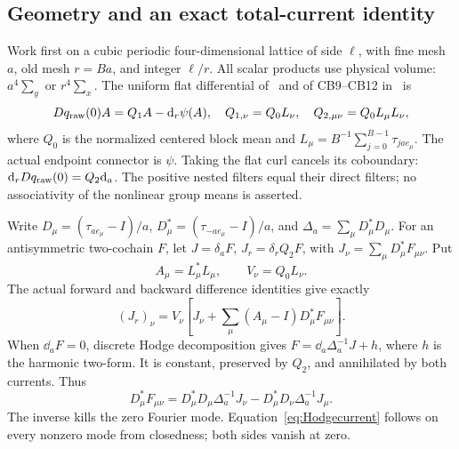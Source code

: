 \documentclass[11pt,letterpaper]{article}
\numberwithin{equation}{section}
\theoremstyle{definition}\newtheorem{definition}[theorem]{Definition}
\theoremstyle{remark}\newtheorem{remark}[theorem]{Remark}
\begin{document}
\subsection{Geometry and an exact total-current identity}

Work first on a cubic periodic four-dimensional lattice of side $\ell$, with fine mesh $a$, old mesh $r=Ba$, and integer $\ell/r$. All scalar products use physical volume: $a^4\sum_y$ or $r^4\sum_x$. The uniform flat differential of~\cite[\S2.1]{UA} and of CB9--CB12 in~\cite[pp.~667--672]{W} is
\begin{equation}
 Dq_{\rm raw}(0)A=Q_1A-\mathrm d_r\psi(A),\quad
 Q_{1,\nu}=Q_0L_\nu,\quad Q_{2,\mu\nu}=Q_0L_\mu L_\nu,
 \label{eq:qflat}
\end{equation}
where $Q_0$ is the normalized centered block mean and
$L_\mu=B^{-1}\sum_{j=0}^{B-1}\tau_{jae_\mu}$. The actual endpoint connector is $\psi$. Taking the flat curl cancels its coboundary:
$\mathrm d_rDq_{\rm raw}(0)=Q_2\mathrm d_a$.
The positive nested filters equal their direct filters; no associativity of the nonlinear group means is asserted.

Write $D_\mu=(\tau_{ae_\mu}-I)/a$, $D_\mu^*=(\tau_{-ae_\mu}-I)/a$, and $\Delta_a=\sum_\mu D_\mu^*D_\mu$. For an antisymmetric two-cochain $F$, let $J=\delta_aF$, $J_r=\delta_rQ_2F$, with
$J_\nu=\sum_\mu D_\mu^*F_{\mu\nu}$. Put
\[
 A_\mu=L_\mu^*L_\mu,\qquad V_\nu=Q_0L_\nu.
\]
The actual forward and backward difference identities give exactly
\begin{equation}
 (J_r)_\nu=V_\nu\left[J_\nu+
             \sum_\mu(A_\mu-I)D_\mu^*F_{\mu\nu}\right].
 \label{eq:currentexact}
\end{equation}
When $\dd_aF=0$, discrete Hodge decomposition gives
$F=\dd_a\Delta_a^{-1}J+h$, where $h$ is the harmonic two-form. It is constant, preserved by $Q_2$, and annihilated by both currents. Thus
\begin{equation}
 D_\mu^*F_{\mu\nu}
 =D_\mu^*D_\mu\Delta_a^{-1}J_\nu
  -D_\mu^*D_\nu\Delta_a^{-1}J_\mu.
 \label{eq:Hodgecurrent}
\end{equation}
The inverse kills the zero Fourier mode. Equation~\eqref{eq:Hodgecurrent} follows on every nonzero mode from closedness; both sides vanish at zero.
\end{document}
